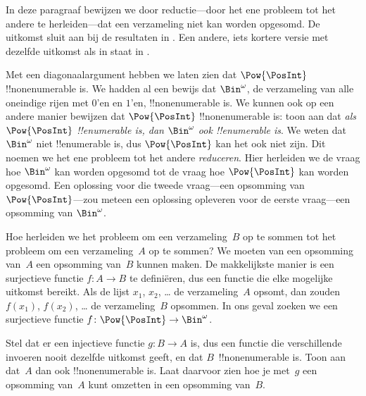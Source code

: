 \documentclass[../../../include/open-logic-section]{subfiles}
\begin{document}


\begin{editorial}
  In deze paragraaf bewijzen we door reductie---door het ene probleem
  tot het andere te herleiden---dat een verzameling niet kan worden
  opgesomd. De uitkomst sluit aan bij de resultaten in
  . Een andere, iets kortere versie met dezelfde
  uitkomst als in  staat in .
\end{editorial}

Met een diagonaalargument hebben we laten zien dat $\Pow{\PosInt}$
!!{nonenumerable} is. We hadden al een bewijs dat $\Bin^\omega$, de
verzameling van alle oneindige rijen met $0$'en en $1$'en,
!!{nonenumerable} is. We kunnen ook op een andere manier bewijzen dat
$\Pow{\PosInt}$ !!{nonenumerable} is: toon aan dat \emph{als
$\Pow{\PosInt}$ !!{enumerable} is, dan $\Bin^\omega$ ook
!!{enumerable} is}. We weten dat $\Bin^\omega$ niet !!{enumerable} is,
dus $\Pow{\PosInt}$ kan het ook niet zijn. Dit noemen we het ene
probleem tot het andere \emph{reduceren}. Hier herleiden we de vraag
hoe $\Bin^\omega$ kan worden opgesomd tot de vraag hoe
$\Pow{\PosInt}$ kan worden opgesomd. Een oplossing voor die tweede
vraag---een opsomming van $\Pow{\PosInt}$---zou meteen een oplossing
opleveren voor de eerste vraag---een opsomming van $\Bin^\omega$.

Hoe herleiden we het probleem om een verzameling~$B$ op te sommen tot
het probleem om een verzameling~$A$ op te sommen? We moeten van een
opsomming van~$A$ een opsomming van~$B$ kunnen maken. De makkelijkste
manier is een surjectieve functie $f\colon A \to B$ te definiëren,
dus een functie die elke mogelijke uitkomst bereikt. Als de lijst $x_1$,
$x_2$, \dots{} de verzameling~$A$ opsomt, dan zouden $f(x_1)$, $f(x_2)$,
\dots{} de verzameling~$B$ opsommen. In ons geval zoeken we een
surjectieve functie $f\colon \Pow{\PosInt} \to \Bin^\omega$.

\begin{prob}
Stel dat er een injectieve functie $g\colon B \to A$ is, dus een
functie die verschillende invoeren nooit dezelfde uitkomst geeft, en
dat $B$~!!{nonenumerable} is. Toon aan dat~$A$ dan ook
!!{nonenumerable} is. Laat daarvoor zien hoe je met~$g$ een opsomming
van~$A$ kunt omzetten in een opsomming van~$B$.
\end{prob}
\end{document}
